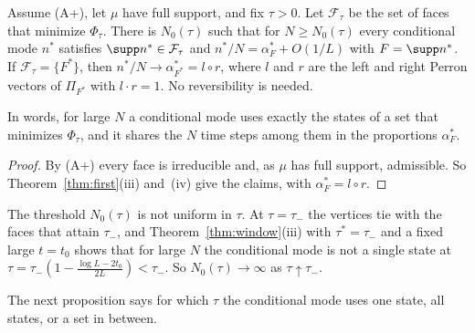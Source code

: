 \begin{corollary}\label{cor:map}
Assume \textup{(A+)}, let $\mu$ have full support, and fix $\tau>0$. Let
$\mathcal F_\tau$ be the set of faces that minimize $\Phi_\tau$. There is
$N_0(\tau)$ such that for $N\ge N_0(\tau)$ every conditional mode $n^*$
satisfies $\supp n^*\in\mathcal F_\tau$ and $n^*/N=\alpha^*_F+O(1/L)$ with
$F=\supp n^*$. If $\mathcal F_\tau=\{F^*\}$, then
$n^*/N\to\alpha^*_{F^*}=l\circ r$, where $l$ and $r$ are the left and right
Perron vectors of $\Pi_{F^*}$ with $l\cdot r=1$. No reversibility is needed.
\end{corollary}

In words, for large $N$ a conditional mode uses exactly the states of a set that
minimizes $\Phi_\tau$, and it shares the $N$ time steps among them in the
proportions $\alpha^*_F$.

\begin{proof}
By (A+) every face is irreducible and, as $\mu$ has full support,
admissible. So Theorem~\ref{thm:first}(iii) and~(iv) give the claims, with
$\alpha^*_F=l\circ r$.
\end{proof}

The threshold $N_0(\tau)$ is not uniform in $\tau$. At $\tau=\tau_-$ the
vertices tie with the faces that attain $\tau_-$, and
Theorem~\ref{thm:window}(iii) with $\tau^*=\tau_-$ and a fixed large $t=t_0$
shows that for large $N$ the conditional mode is not a single state at
$\tau=\tau_-(1-\frac{\log L-2t_0}{2L})<\tau_-$. So $N_0(\tau)\to\infty$ as
$\tau\uparrow\tau_-$.

The next proposition says for which $\tau$ the conditional mode uses one state, all
states, or a set in between.

